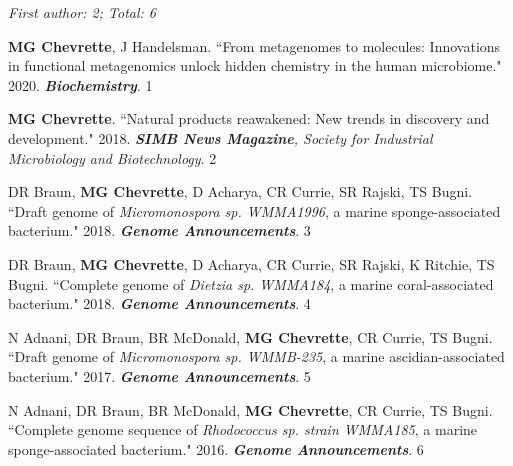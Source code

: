 \begin{cvpubs}

\cvpub
{\hspace{-1cm} \textit{First author: 2; Total: 6}}
{}

\cvpub
{\textbf{MG Chevrette}, J Handelsman. ``From metagenomes to molecules: Innovations in functional metagenomics unlock hidden chemistry in the human microbiome." 2020. \textit{\textbf{Biochemistry}}. \textbf{\textit{}}}
{1}

\cvpub
{\textbf{MG Chevrette}. ``Natural products reawakened: New trends in discovery and development." 2018. \textit{\textbf{SIMB News Magazine}, Society for Industrial Microbiology and Biotechnology}. }
{2}

\cvpub
{DR Braun, \textbf{MG Chevrette}, D Acharya, CR Currie, SR Rajski, TS Bugni. ``Draft genome of \textit{Micromonospora sp. WMMA1996}, a marine sponge-associated bacterium." 2018. \textit{\textbf{Genome Announcements}}. \textbf{\textit{}}}
{3}

\cvpub
{DR Braun, \textbf{MG Chevrette}, D Acharya, CR Currie, SR Rajski, K Ritchie, TS Bugni. ``Complete genome of \textit{Dietzia sp. WMMA184}, a marine coral-associated bacterium." 2018. \textit{\textbf{Genome Announcements}}. \textbf{\textit{}}}
{4}

\cvpub
{N Adnani, DR Braun, BR McDonald, \textbf{MG Chevrette}, CR Currie, TS Bugni. ``Draft genome of \textit{Micromonospora sp. WMMB-235}, a marine ascidian-associated bacterium." 2017. \textit{\textbf{Genome Announcements}}. \textbf{\textit{}}}
{5}

\end{cvpubs} \begin{cvpubs}

\cvpub
{N Adnani, DR Braun, BR McDonald, \textbf{MG Chevrette}, CR Currie, TS Bugni. ``Complete genome sequence of \textit{Rhodococcus sp. strain WMMA185}, a marine sponge-associated bacterium." 2016. \textit{\textbf{Genome Announcements}}. \textbf{\textit{}}}
{6}

\end{cvpubs}


